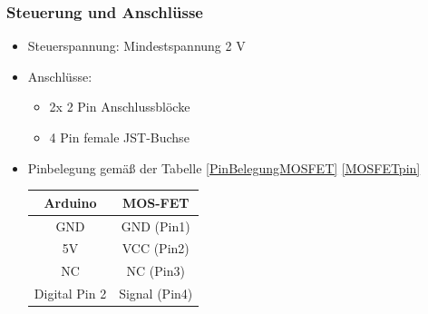 \subsubsection{Steuerung und Anschlüsse \cite{ReicheltMOS:2025}}
\begin{itemize}
	\item Steuerspannung: Mindestspannung 2 V
	\item Anschlüsse:
	\begin{itemize}
		\item 2x 2 Pin Anschlussblöcke
		\item 4 Pin female JST-Buchse
	\end{itemize}
	\item Pinbelegung gemäß der Tabelle \ref{PinBelegungMOSFET} \ref{MOSFETpin}

		\begin{center}
			\begin{tabular}{c|c}
				Arduino & MOS-FET\\ \hline
				GND & GND (Pin1)\\
				5V & VCC (Pin2)\\
				NC & NC (Pin3)\\
				Digital Pin 2 & Signal (Pin4)\\
			\end{tabular}
			\label{PinBelegungMOSFET}
		\end{center}
	\end{itemize}
